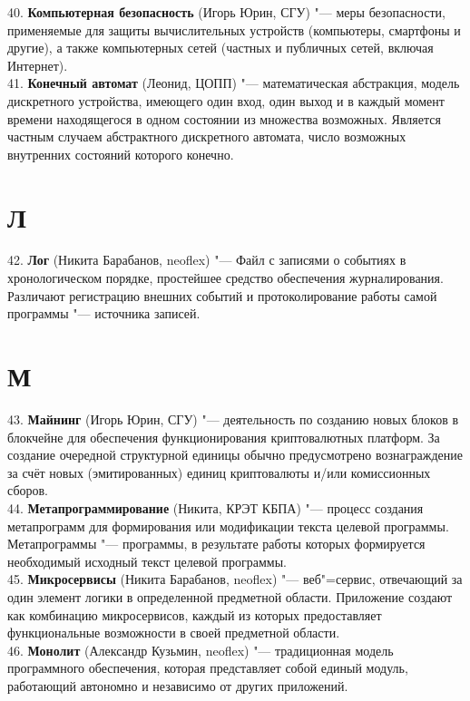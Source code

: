 \documentclass[14 pt]{extarticle}
\begin{document}
    40. \textbf{Компьютерная безопасность} (Игорь Юрин, СГУ) "--- меры безопасности, применяемые для защиты вычислительных устройств (компьютеры, смартфоны и другие), а также компьютерных сетей (частных и публичных сетей, включая Интернет). \\
    
    41. \textbf{Конечный автомат} (Леонид, ЦОПП) "--- математическая абстракция, модель дискретного устройства, имеющего один вход, один выход и в каждый момент времени находящегося в одном состоянии из множества возможных. Является частным случаем абстрактного дискретного автомата, число возможных внутренних состояний которого конечно.  \\
    
\section*{Л}
    42. \textbf{Лог} (Никита Барабанов, neoflex) "--- Файл с записями о событиях в хронологическом порядке, простейшее средство обеспечения журналирования. Различают регистрацию внешних событий и протоколирование работы самой программы "--- источника записей.  \\
    
\section*{М}
    43. \textbf{Майнинг} (Игорь Юрин, СГУ) "--- деятельность по созданию новых блоков в блокчейне для обеспечения функционирования криптовалютных платформ. За создание очередной структурной единицы обычно предусмотрено вознаграждение за счёт новых (эмитированных) единиц криптовалюты и/или комиссионных сборов. \\
    
    44. \textbf{Метапрограммирование} (Никита, КРЭТ КБПА) "--- процесс создания метапрограмм для формирования или модификации текста целевой программы. Метапрограммы "--- программы, в результате работы которых формируется необходимый исходный текст целевой программы. \\
    
    45. \textbf{Микросервисы} (Никита Барабанов, neoflex) "--- веб"=сервис, отвечающий за один элемент логики в определенной предметной области. Приложение создают как комбинацию микросервисов, каждый из которых предоставляет функциональные возможности в своей предметной области. \\
    
    46. \textbf{Монолит} (Александр Кузьмин, neoflex) "--- традиционная модель программного обеспечения, которая представляет собой единый модуль, работающий автономно и независимо от других приложений. \\
    
\end{document}
